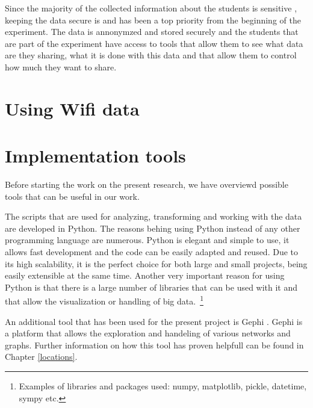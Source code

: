 Since the majority of the collected information about the students is sensitive
\cite{Stopczynski14p}, keeping the data secure is and has been a top priority
from the beginning of the experiment. The data is annonymzed and stored securely
and the students that are part of the experiment have access to tools that allow
them to see what data are they sharing, what it is done with this data and that
allow them to control how much they want to share.

\section{Using Wifi data}

\section{Implementation tools}
Before starting the work on the present research, we have overviewd possible
tools that can be useful in our work.

The scripts that are used for analyzing, transforming and working with the data
are developed in Python. The reasons behing using Python instead of any other
programming language are numerous. Python is elegant and simple to use, it
allows fast development and the code can be easily adapted and reused. Due to
its high scalability, it is the perfect choice for both large and small
projects, being easily extensible at the same time. Another very important
reason for using Python is that there is a large number of libraries that can be
used with it and that allow the visualization or handling of big
data.~\footnote{Examples of libraries and packages used: numpy, matplotlib,
pickle, datetime, sympy etc.}

An additional tool that has been used for the present project is Gephi
\cite{Gephi}. Gephi is a platform that allows the exploration and handeling of
various networks and graphs. Further information on how this tool has proven
helpfull can be found in Chapter \ref{locations}.